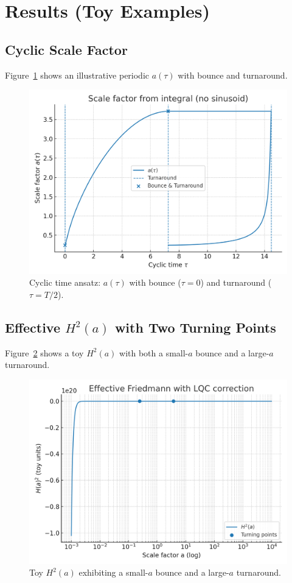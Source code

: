 \documentclass[12pt]{article}
\begin{document}
\section{Results (Toy Examples)}
\subsection{Cyclic Scale Factor}
Figure~\ref{fig:atau} shows an illustrative periodic $a(\tau)$ with bounce and turnaround.

\begin{figure}[h]
\centering
\includegraphics[width=0.7\linewidth]{figures/plot_a_tau_from_integral.png}
\caption{Cyclic time ansatz: $a(\tau)$ with bounce ($\tau=0$) and turnaround ($\tau=T/2$).}
\label{fig:atau}
\end{figure}

\subsection{Effective $H^2(a)$ with Two Turning Points}
Figure~\ref{fig:h2a} shows a toy $H^2(a)$ with both a small-$a$ bounce and a large-$a$ turnaround.

\begin{figure}[h]
\centering
\includegraphics[width=0.7\linewidth]{figures/plot_H2_from_params.png}
\caption{Toy $H^2(a)$ exhibiting a small-$a$ bounce and a large-$a$ turnaround.}
\label{fig:h2a}
\end{figure}
\end{document}
